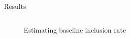 \documentclass[9pt,aspectratio=169]{beamer}
\begin{document}
\begin{frame}{Results}
\begin{columns}
\begin{column}{0.382\linewidth}
\begin{figure}
{				\caption{Estimating baseline inclusion rate}
			}

		\end{figure}
	\end{column}
\end{columns}


\end{frame}
\end{document}
